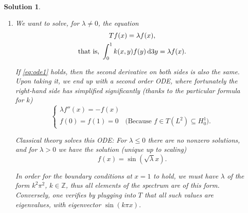 \documentclass{article}
\theoremstyle{nonumberplain}
\newtheorem{sol}{Solution}
\newcommand{\Z}{\mathbb{Z}}
\DeclarePairedDelimiter{\Norm}{\lVert}{\rVert}
\begin{document}
\begin{sol}
\begin{enumerate}
Moreover, $S(f)$ is in $L^2$ because it is integration against an $L^2$ kernel.

To see that $Tf$ is moreover in $H^1_0$, we note that it is continuous (because it is in $H^1$) and by the previous problem, to verify that it is in $H^1_0$ it suffices to compute $Tf(0)$ and $Tf(1)$. We do one of them; the other is the same:
\begin{equation}
Tf(0) = \int_0^1 k(0,y) f(y) \dl3 y = \int_0^1 0 = 0.
\end{equation}

Thus, $Tf \in H^1_0$.

(Side note: We also showed that $T$ is a bounded operator $L^2 \to H^1$, because $\Norm{Tf}_{H^1} \leq \Norm{Tf}_{L^2} + \Norm{Sf}_{L^2} \leq (\Norm{T} + \Norm{S}) \Norm{f}_{L^2}$.)

\item We want to solve, for $\lambda \neq 0$, the equation
\begin{equation}\label{eq:ode1}
\begin{gathered}
Tf(x) = \lambda f(x),\\
\text{that is, } \int_0^1 k(x,y) f(y) \dl3 y = \lambda f(x).
\end{gathered}
\end{equation}

If \eqref{eq:ode1} holds, then the second derivative on both sides is also the same. Upon taking it, we end up with a second order ODE, where fortunately the right-hand side has simplified significantly (thanks to the particular formula for $k$)
\begin{equation}
\begin{cases}
\lambda f''(x) = - f(x)\\
f(0)=f(1)=0 & \text{(Because $f \in T(L^2) \subseteq H^1_0$)}.
\end{cases}
\end{equation}

Classical theory solves this ODE: For $\lambda \leq 0$ there are no nonzero solutions, and for $\lambda > 0$ we have the solution (unique up to scaling)
\begin{equation}
f(x) = \sin(\sqrt\lambda x).
\end{equation}

In order for the boundary conditions at $x=1$ to hold, we must have $\lambda$ of the form $k^2 \pi^2$, $k \in \Z$, thus all elements of the spectrum are of this form. Conversely, one verifies by plugging into $T$ that all such values are eigenvalues, with eigenvector $\sin(k \pi x)$.


\end{enumerate}
\end{sol}
\end{document}
